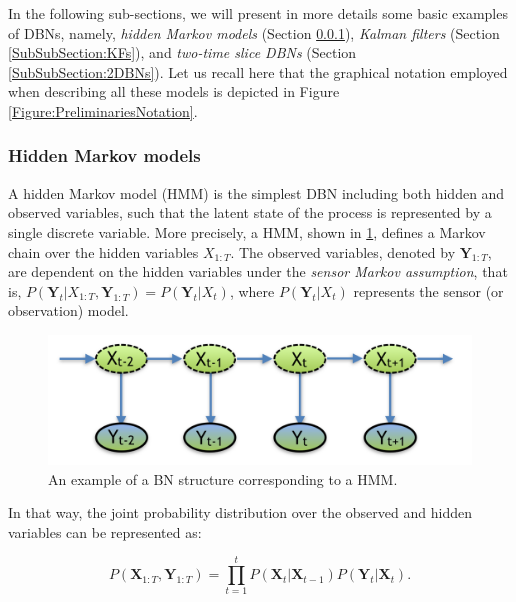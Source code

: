 In the following sub-sections, we will present in more details some basic examples of DBNs, namely, \textit{hidden Markov models} (Section \ref{SubSubSection:HMMs}), \textit{Kalman filters} (Section \ref{SubSubSection:KFs}), and \textit{two-time slice DBNs} (Section \ref{SubSubSection:2DBNs}). Let us recall here that the graphical notation employed when describing all these models is depicted in Figure \ref{Figure:PreliminariesNotation}.

\subsubsection{Hidden Markov models}\label{SubSubSection:HMMs}

A hidden Markov model (HMM) is the simplest DBN including both hidden and observed variables, such that the latent state of the process is represented by a single discrete variable. More precisely, a HMM, shown in \ref{Figure:HMM}, defines a Markov chain over the hidden variables $X_{1:T}$. The observed variables, denoted by $\bm Y_{1:T}$, are dependent on the hidden variables under the \textit{sensor Markov assumption}, that is, $P(\bm Y_t| X_{1:T}, \bm Y_{1:T}) = P(\bm Y_t| X_t)$, where $P(\bm Y_t| X_t)$ represents the sensor (or observation) model.  

\begin{figure}[ht!]
\begin{center}
\includegraphics[scale=0.4]{./figures/PreliminariesHMM}
\caption{\label{Figure:HMM}An example of a BN structure corresponding to a HMM.}
\end{center}
\end{figure}

In that way, the joint probability distribution over the observed and hidden variables can be represented as:

\begin{equation}
P(\bm X_{1:T},\bm Y_{1:T}) = \prod_{t=1}^t{P(\bm X_t| \bm X_{t-1})P(\bm Y_t|\bm X_t)}.
\end{equation}

